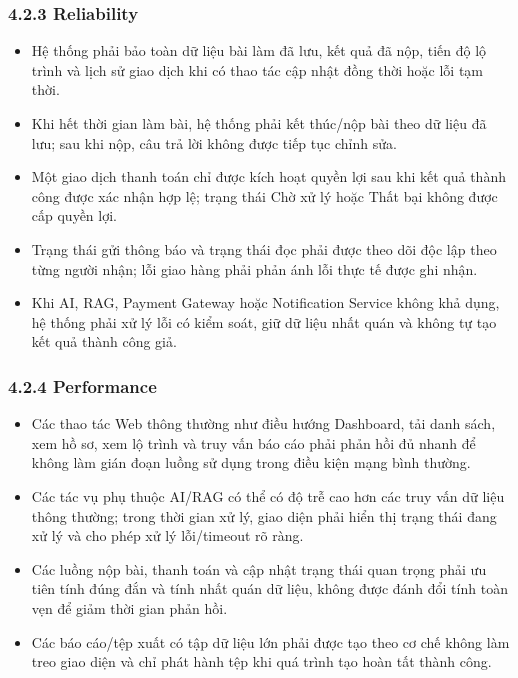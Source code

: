 \documentclass[12pt,a4paper,oneside]{report}
\begin{document}
\subsubsection*{4.2.3 Reliability}

\begin{itemize}
    \item Hệ thống phải bảo toàn dữ liệu bài làm đã lưu, kết quả đã nộp, tiến độ lộ trình và lịch sử giao dịch khi có thao tác cập nhật đồng thời hoặc lỗi tạm thời.
    \item Khi hết thời gian làm bài, hệ thống phải kết thúc/nộp bài theo dữ liệu đã lưu; sau khi nộp, câu trả lời không được tiếp tục chỉnh sửa.
    \item Một giao dịch thanh toán chỉ được kích hoạt quyền lợi sau khi kết quả thành công được xác nhận hợp lệ; trạng thái Chờ xử lý hoặc Thất bại không được cấp quyền lợi.
    \item Trạng thái gửi thông báo và trạng thái đọc phải được theo dõi độc lập theo từng người nhận; lỗi giao hàng phải phản ánh lỗi thực tế được ghi nhận.
    \item Khi AI, RAG, Payment Gateway hoặc Notification Service không khả dụng, hệ thống phải xử lý lỗi có kiểm soát, giữ dữ liệu nhất quán và không tự tạo kết quả thành công giả.
\end{itemize}

\subsubsection*{4.2.4 Performance}

\begin{itemize}
    \item Các thao tác Web thông thường như điều hướng Dashboard, tải danh sách, xem hồ sơ, xem lộ trình và truy vấn báo cáo phải phản hồi đủ nhanh để không làm gián đoạn luồng sử dụng trong điều kiện mạng bình thường.
    \item Các tác vụ phụ thuộc AI/RAG có thể có độ trễ cao hơn các truy vấn dữ liệu thông thường; trong thời gian xử lý, giao diện phải hiển thị trạng thái đang xử lý và cho phép xử lý lỗi/timeout rõ ràng.
    \item Các luồng nộp bài, thanh toán và cập nhật trạng thái quan trọng phải ưu tiên tính đúng đắn và tính nhất quán dữ liệu, không được đánh đổi tính toàn vẹn để giảm thời gian phản hồi.
    \item Các báo cáo/tệp xuất có tập dữ liệu lớn phải được tạo theo cơ chế không làm treo giao diện và chỉ phát hành tệp khi quá trình tạo hoàn tất thành công.
\end{itemize}
\end{document}
